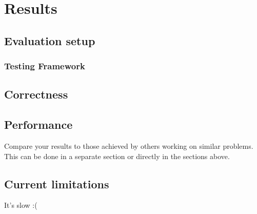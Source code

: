 \chapter{Results}
\label{ch:results}

\section{Evaluation setup}

\subsection{Testing Framework}
\label{subsec:testing-framework}

\section{Correctness}

\section{Performance}

Compare your results to those achieved by others working on similar problems.
This can be done in a separate section or directly in the sections above.

\section{Current limitations}

It's slow :(
